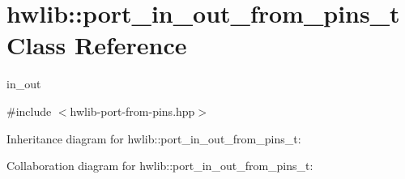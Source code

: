 \hypertarget{classhwlib_1_1port__in__out__from__pins__t}{}\section{hwlib\+:\+:port\+\_\+in\+\_\+out\+\_\+from\+\_\+pins\+\_\+t Class Reference}
\label{classhwlib_1_1port__in__out__from__pins__t}


in\+\_\+out  




{\ttfamily \#include $<$hwlib-\/port-\/from-\/pins.\+hpp$>$}



Inheritance diagram for hwlib\+:\+:port\+\_\+in\+\_\+out\+\_\+from\+\_\+pins\+\_\+t\+:


Collaboration diagram for hwlib\+:\+:port\+\_\+in\+\_\+out\+\_\+from\+\_\+pins\+\_\+t\+:
